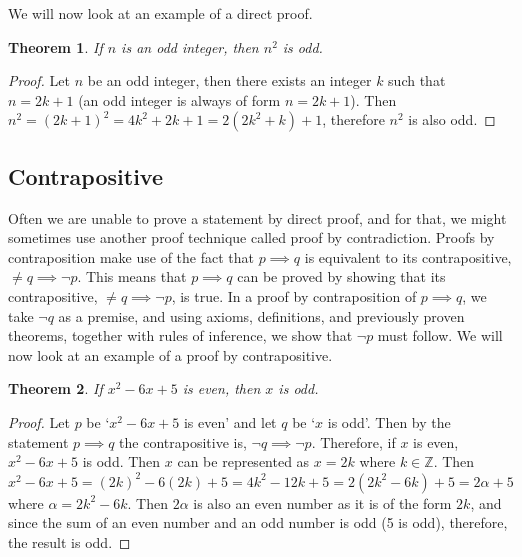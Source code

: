 \documentclass[12pt]{exam}
\newtheorem{theorem}{Theorem}
\begin{document}
We will now look at an example of a direct proof.
\begin{theorem}
    If $n$ is an odd integer, then $n^2$ is odd.
\end{theorem}
\begin{proof}
    Let $n$ be an odd integer, then there exists an integer $k$ such that $n = 2k+1$ (an odd integer is always of form $n = 2k+1$).
    Then $n^2 = (2k+1)^2 =  4k^2 + 2k + 1 = 2(2k^2 + k) + 1$, therefore $n^2$ is also odd.
\end{proof}



\subsection*{Contrapositive}
Often we are unable to prove a statement by direct proof, and for that, we might sometimes use another proof technique called proof by contradiction.
Proofs by contraposition make use of the fact that $p \implies q$ is equivalent to its contrapositive, $\neq q \implies \neg p$. 
This means that $p \implies q$ can be proved by showing that its contrapositive, $\neq q \implies \neg p$, is true. 
In a proof by contraposition of $p \implies q$, we take $\neg q$ as a premise, and using axioms, definitions, and previously proven theorems, together with rules of inference, we show that $\neg p$ must follow. 
We will now look at an example of a proof by contrapositive.

\begin{theorem}
    If $x^{2} - 6x + 5$ is even, then $x$ is odd.
\end{theorem}
\begin{proof}
    Let $p$ be `$x^2 - 6x + 5$ is even' and let $q$ be `$x$ is odd'.
    Then by the statement $ p \implies q $ the contrapositive is, $ \neg q \implies \neg p $.
    Therefore, if $x$ is even, $x^2 -6x + 5 $ is odd.
    Then $x$ can be represented as $x = 2k$ where $k \in \mathbb{Z} $.
    Then $x^2 - 6x + 5 = (2k)^2 - 6(2k) + 5 = 4k^2 -12k + 5  = 2(2k^2 - 6k) + 5 =2\alpha + 5$ where $ \alpha = 2k^2 - 6k$. 
    Then $ 2\alpha $ is also an even number as it is of the form $ 2k $, and since the sum of an even number and an odd number is odd (5 is odd), therefore, the result is odd. 
\end{proof}
 
\end{document}
